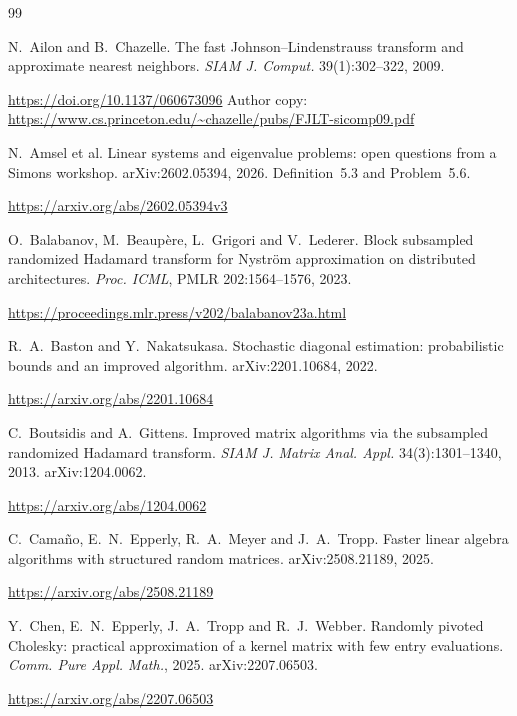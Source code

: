 \documentclass[11pt,a4paper]{article}
\theoremstyle{definition}
\theoremstyle{remark}
\numberwithin{equation}{section}
\begin{document}
\begin{thebibliography}{99}\small\raggedright

N.~Ailon and B.~Chazelle.
\newblock The fast Johnson--Lindenstrauss transform and approximate nearest neighbors.
\newblock \emph{SIAM J. Comput.} 39(1):302--322, 2009.

\newblock \url{https://doi.org/10.1137/060673096}
\newblock Author copy: \url{https://www.cs.princeton.edu/~chazelle/pubs/FJLT-sicomp09.pdf}

N.~Amsel et al.
\newblock Linear systems and eigenvalue problems: open questions from a Simons workshop.
\newblock arXiv:2602.05394, 2026. Definition~5.3 and Problem~5.6.

\newblock \url{https://arxiv.org/abs/2602.05394v3}

O.~Balabanov, M.~Beaup\`ere, L.~Grigori and V.~Lederer.
\newblock Block subsampled randomized Hadamard transform for Nystr\"om approximation on distributed architectures.
\newblock \emph{Proc. ICML}, PMLR 202:1564--1576, 2023.

\newblock \url{https://proceedings.mlr.press/v202/balabanov23a.html}

R.~A.~Baston and Y.~Nakatsukasa.
\newblock Stochastic diagonal estimation: probabilistic bounds and an improved algorithm.
\newblock arXiv:2201.10684, 2022.

\newblock \url{https://arxiv.org/abs/2201.10684}

C.~Boutsidis and A.~Gittens.
\newblock Improved matrix algorithms via the subsampled randomized Hadamard transform.
\newblock \emph{SIAM J. Matrix Anal. Appl.} 34(3):1301--1340, 2013. arXiv:1204.0062.

\newblock \url{https://arxiv.org/abs/1204.0062}

C.~Cama\~no, E.~N.~Epperly, R.~A.~Meyer and J.~A.~Tropp.
\newblock Faster linear algebra algorithms with structured random matrices.
\newblock arXiv:2508.21189, 2025.

\newblock \url{https://arxiv.org/abs/2508.21189}

Y.~Chen, E.~N.~Epperly, J.~A.~Tropp and R.~J.~Webber.
\newblock Randomly pivoted Cholesky: practical approximation of a kernel matrix with few entry evaluations.
\newblock \emph{Comm. Pure Appl. Math.}, 2025. arXiv:2207.06503.

\newblock \url{https://arxiv.org/abs/2207.06503}


\end{thebibliography}
\end{document}
